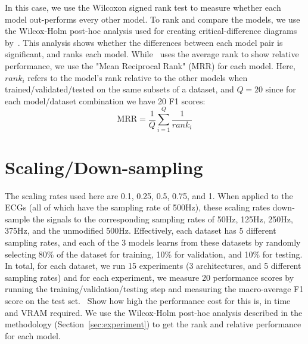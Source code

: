 \documentclass[pmlr,twocolumn]{jmlr}%
\begin{document}
In this case, we use the Wilcoxon signed rank test to measure whether each model out-performs every other model. To rank and compare the models, we use the Wilcox-Holm post-hoc analysis used for creating critical-difference diagrams by~\cite{IsmailFawaz2018deep}. This analysis shows whether the differences between each model pair is significant, and ranks each model. While~\cite{IsmailFawaz2018deep} uses the average rank to show relative performance, we use the "Mean Reciprocal Rank" (MRR) for each model. Here, $rank_i$ refers to the model's rank relative to the other models when trained/validated/tested on the same subsets of a dataset, and $Q=20$ since for each model/dataset combination we have 20 F1 scores:
\[ \text{MRR} = \frac{1}{Q}\sum_{i=1}^{Q}\frac{1}{rank_i} \]


\section{Scaling/Down-sampling}
\label{sec:scaling}
The scaling rates used here are 0.1, 0.25, 0.5, 0.75, and 1. When applied to the ECGs (all of which have the sampling rate of 500Hz), these scaling rates down-sample the signals to the corresponding sampling rates of 50Hz, 125Hz, 250Hz, 375Hz, and the unmodified 500Hz. Effectively, each dataset has 5 different sampling rates, and each of the 3 models learns from these datasets by randomly selecting 80\% of the dataset for training, 10\% for validation, and 10\% for testing. In total, for each dataset, we run 15 experiments (3 architectures, and 5 different sampling rates) and for each experiment, we measure 20 performance scores by running the training/validation/testing step and measuring the macro-average F1 score on the test set.~{\color{red} Show how high the performance cost for this is, in time and VRAM required}. We use the Wilcox-Holm post-hoc analysis described in the methodology (Section~\ref{sec:experiment}) to get the rank and relative performance for each model. 
\end{document}
